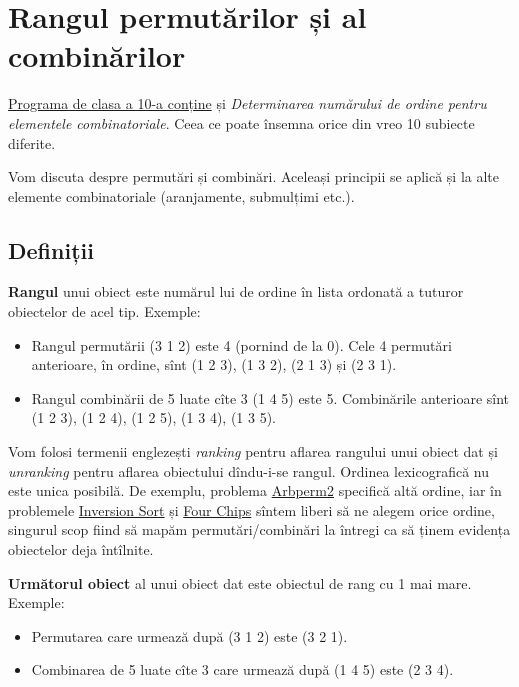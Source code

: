 \documentclass[../main.tex]{subfiles}
\begin{document}
\chapter{Rangul permutărilor și al combinărilor}

\href{https://sepi.ro/assets/upload-file/oni2024/Programa\%20pentru\%20olimpiada\%20de\%20informatica_gimnaziu\%20si\%20liceu.pdf}{Programa de clasa a 10-a conține} și \textit{Determinarea numărului de ordine pentru elementele combinatoriale}. Ceea ce poate însemna orice din vreo 10 subiecte diferite. 

Vom discuta despre permutări și combinări. Aceleași principii se aplică și la alte elemente combinatoriale (aranjamente, submulțimi etc.).

\section{Definiții}

\textbf{Rangul} unui obiect este numărul lui de ordine în lista ordonată a tuturor obiectelor de acel tip. Exemple:

\begin{itemize}
  \item Rangul permutării (3 1 2) este 4 (pornind de la 0). Cele 4 permutări anterioare, în ordine, sînt (1 2 3), (1 3 2), (2 1 3) și (2 3 1).

  \item Rangul combinării de 5 luate cîte 3 (1 4 5) este 5. Combinările anterioare sînt (1 2 3), (1 2 4), (1 2 5), (1 3 4), (1 3 5).
\end{itemize}

Vom folosi termenii englezești \textit{ranking} pentru aflarea rangului unui obiect dat și \textit{unranking} pentru aflarea obiectului dîndu-i-se rangul. Ordinea lexicografică nu este unica posibilă. De exemplu, problema \hyperref[problem:arbperm2]{Arbperm2} specifică altă ordine, iar în problemele \hyperref[problem:inversion-sort]{Inversion Sort} și \hyperref[problem:four-chips]{Four Chips} sîntem liberi să ne alegem orice ordine, singurul scop fiind să mapăm permutări/combinări la întregi ca să ținem evidența obiectelor deja întîlnite.

\textbf{Următorul obiect} al unui obiect dat este obiectul de rang cu 1 mai mare. Exemple:

\begin{itemize}
  \item Permutarea care urmează după (3 1 2) este (3 2 1).
  \item Combinarea de 5 luate cîte 3  care urmează după (1 4 5) este (2 3 4).
\end{itemize}
\end{document}
